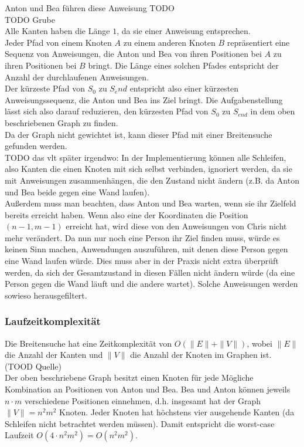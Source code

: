 \documentclass[a4paper,10pt,ngerman]{scrartcl}
\begin{document}
Anton und Bea führen diese Anweisung
TODO \\
TODO Grube \\
Alle Kanten haben die Länge $1$, da sie einer Anweisung entsprechen. \\


Jeder Pfad von einem Knoten $A$ zu einem anderen Knoten $B$ repräsentiert eine Sequenz von Anweisungen, die Anton und Bea von ihren Positionen bei $A$ zu ihren Positionen bei $B$ bringt.
Die Länge eines solchen Pfades entspricht der Anzahl der durchlaufenen Anweisungen.\\
Der kürzeste Pfad von $S_0$ zu $S_end$ entspricht also einer kürzesten Anweisungssequenz, die Anton und Bea ins Ziel bringt. Die Aufgabenstellung lässt sich also darauf reduzieren, den kürzesten Pfad von $S_0$ zu $S_{end}$ in dem oben beschriebenen Graph zu finden. \\
Da der Graph nicht gewichtet ist, kann dieser Pfad mit einer Breitensuche gefunden werden.\\

TODO das vlt später irgendwo: In der Implementierung können alle Schleifen, also Kanten die einen Knoten mit sich selbst verbinden, ignoriert werden, da sie mit Anweisungen zusammenhängen, die den Zustand nicht ändern (z.B. da Anton und Bea beide gegen eine Wand laufen). \\
Außerdem muss man beachten, dass Anton und Bea warten, wenn sie ihr Zielfeld bereits erreicht haben. Wenn also eine der Koordinaten die Position $(n-1,m-1)$ erreicht hat, wird diese von den Anweisungen von Chris nicht mehr verändert. Da nun nur noch eine Person ihr Ziel finden muss, würde es keinen Sinn machen, Anwendungen auszuführen, mit denen diese Person gegen eine Wand laufen würde. Dies muss aber in der Praxis nicht extra überprüft werden, da sich der Gesamtzustand in diesen Fällen nicht ändern würde (da eine Person gegen die Wand läuft und die andere wartet). Solche Anweisungen werden sowieso herausgefiltert.
\subsubsection{Laufzeitkomplexität}
Die Breitensuche hat eine Zeitkomplexität von $O(\|E\| + \|V\|)$, wobei $\|E\|$ die Anzahl der Kanten und $\|V\|$ die Anzahl der Knoten im Graphen ist. (TOOD Quelle) \\
Der oben beschriebene Graph besitzt einen Knoten für jede Mögliche Kombination an Positionen von Anton und Bea. Bea und Anton können jeweils $n \cdot m$ verschiedene Positionen einnehmen, d.h. insgesamt hat der Graph $\|V\| = n^2 m^2$ Knoten.
Jeder Knoten hat höchstens vier ausgehende Kanten (da Schleifen nicht betrachtet werden müssen). Damit entspricht die worst-case Laufzeit $O(4 \cdot n^2 m^2) = O(n^2 m^2)$.
\end{document}
